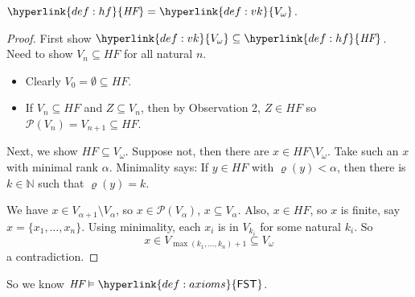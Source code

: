 \documentclass{article}
\newcommand{\hf}{\textit{HF}}
\newcommand{\1}{\mathbbm{1}}
\let\models\vDash
\begin{document}
\begin{prop}
$\hyperlink{def:hf}{\hf} = \hyperlink{def:vk}{V_\omega}$.
\end{prop}
\begin{proof}
  First show $\hyperlink{def:vk}{V_\omega} \subseteq \hyperlink{def:hf}{\hf}$.
  Need to show $V_n \subseteq \hf$ for all natural $n$.
  \begin{itemize}
    \item Clearly $V_0 = \emptyset \subseteq \hf$.
    \item If $V_n \subseteq \hf$ and $Z \subseteq V_n$, then by Observation 2, $Z \in \hf$ so $\mathcal{P}(V_n) = V_{n+1} \subseteq \hf$.
  \end{itemize}

  Next, we show $\hf \subseteq V_\omega$.
  Suppose not, then there are $x \in \hf \setminus V_\omega$.
  Take such an $x$ with minimal rank $\alpha$.
  Minimality says: If $y \in \hf$ with $\varrho(y) < \alpha$, then there is $k \in \mathbb{N}$ such that $\varrho(y) = k$.

  We have $x \in V_{\alpha+1} \setminus V_\alpha$, so $x \in \mathcal{P}(V_\alpha)$, $x \subseteq V_\alpha$.
  Also, $x \in \hf$, so $x$ is finite, say $x = \{x_1, \dotsc, x_n\}$.
  Using minimality, each $x_i$ is in $V_{k_i}$ for some natural $k_i$. So
  \begin{equation*}
    x \in V_{\max(k_1, \dotsc, k_n) + 1} \subseteq V_\omega
  \end{equation*}
  a contradiction.
\end{proof}
So we know $\hf \models \hyperlink{def:axioms}{\textsf{FST}}$.
\end{document}
